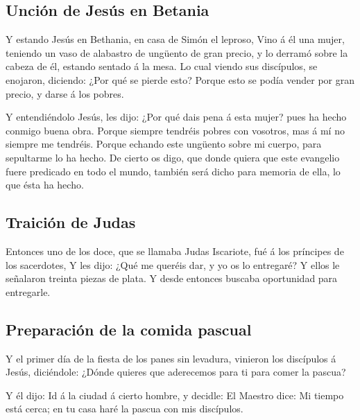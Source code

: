 \hypertarget{unciuxf3n-de-jesuxfas-en-betania}{%
\subsection{Unción de Jesús en
Betania}\label{unciuxf3n-de-jesuxfas-en-betania}}

 Y estando Jesús en Bethania, en casa de Simón el leproso,
 Vino á él una mujer, teniendo un vaso de alabastro de
ungüento de gran precio, y lo derramó sobre la cabeza de él, estando
sentado á la mesa.  Lo cual viendo sus discípulos, se
enojaron, diciendo: ¿Por qué se pierde esto?  Porque esto se
podía vender por gran precio, y darse á los pobres.

 Y entendiéndolo Jesús, les dijo: ¿Por qué dais pena á esta
mujer? pues ha hecho conmigo buena obra.  Porque siempre
tendréis pobres con vosotros, mas á mí no siempre me tendréis.
 Porque echando este ungüento sobre mi cuerpo, para
sepultarme lo ha hecho.  De cierto os digo, que donde
quiera que este evangelio fuere predicado en todo el mundo, también será
dicho para memoria de ella, lo que ésta ha hecho.

\hypertarget{traiciuxf3n-de-judas}{%
\subsection{Traición de Judas}\label{traiciuxf3n-de-judas}}

 Entonces uno de los doce, que se llamaba Judas Iscariote,
fué á los príncipes de los sacerdotes,  Y les dijo: ¿Qué me
queréis dar, y yo os lo entregaré? Y ellos le señalaron treinta piezas
de plata.  Y desde entonces buscaba oportunidad para
entregarle.

\hypertarget{preparaciuxf3n-de-la-comida-pascual}{%
\subsection{Preparación de la comida
pascual}\label{preparaciuxf3n-de-la-comida-pascual}}

 Y el primer día de la fiesta de los panes sin levadura,
vinieron los discípulos á Jesús, diciéndole: ¿Dónde quieres que
aderecemos para ti para comer la pascua?

 Y él dijo: Id á la ciudad á cierto hombre, y decidle: El
Maestro dice: Mi tiempo está cerca; en tu casa haré la pascua con mis
discípulos.

